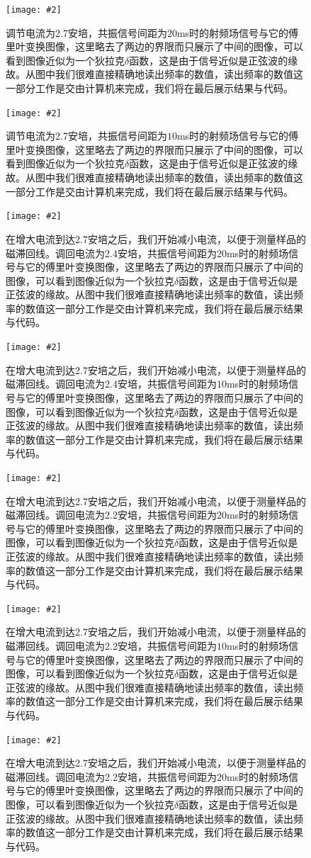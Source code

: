 \documentclass{ctexart}
\newcommand{\cpic}[2]{
\begin{center}
\texttt{[image: \#2]}
\end{center}
}
\newcommand{\cpicn}[3]
{
\begin{figure}[H]
\cpic{#1}{#2}
\caption{#3\label{#2}}
\end{figure}
}
\begin{document}
\cpicn{0.5}{27_1}{调节电流为2.7安培，共振信号间距为$20$ms时的射频场信号与它的傅里叶变换图像，这里略去了两边的界限而只展示了中间的图像，可以看到图像近似为一个狄拉克$\delta$函数，这是由于信号近似是正弦波的缘故。从图中我们很难直接精确地读出频率的数值，读出频率的数值这一部分工作是交由计算机来完成，我们将在最后展示结果与代码。}
\cpicn{0.5}{27_2}{调节电流为2.7安培，共振信号间距为$10$ms时的射频场信号与它的傅里叶变换图像，这里略去了两边的界限而只展示了中间的图像，可以看到图像近似为一个狄拉克$\delta$函数，这是由于信号近似是正弦波的缘故。从图中我们很难直接精确地读出频率的数值，读出频率的数值这一部分工作是交由计算机来完成，我们将在最后展示结果与代码。}
\cpicn{0.5}{24_1b}{在增大电流到达2.7安培之后，我们开始减小电流，以便于测量样品的磁滞回线。调回电流为2.4安培，共振信号间距为$20$ms时的射频场信号与它的傅里叶变换图像，这里略去了两边的界限而只展示了中间的图像，可以看到图像近似为一个狄拉克$\delta$函数，这是由于信号近似是正弦波的缘故。从图中我们很难直接精确地读出频率的数值，读出频率的数值这一部分工作是交由计算机来完成，我们将在最后展示结果与代码。}
\cpicn{0.5}{24_2b}{在增大电流到达2.7安培之后，我们开始减小电流，以便于测量样品的磁滞回线。调回电流为2.4安培，共振信号间距为$10$ms时的射频场信号与它的傅里叶变换图像，这里略去了两边的界限而只展示了中间的图像，可以看到图像近似为一个狄拉克$\delta$函数，这是由于信号近似是正弦波的缘故。从图中我们很难直接精确地读出频率的数值，读出频率的数值这一部分工作是交由计算机来完成，我们将在最后展示结果与代码。}
\cpicn{0.5}{22_1b}{在增大电流到达2.7安培之后，我们开始减小电流，以便于测量样品的磁滞回线。调回电流为2.2安培，共振信号间距为$20$ms时的射频场信号与它的傅里叶变换图像，这里略去了两边的界限而只展示了中间的图像，可以看到图像近似为一个狄拉克$\delta$函数，这是由于信号近似是正弦波的缘故。从图中我们很难直接精确地读出频率的数值，读出频率的数值这一部分工作是交由计算机来完成，我们将在最后展示结果与代码。}
\cpicn{0.5}{22_2b}{在增大电流到达2.7安培之后，我们开始减小电流，以便于测量样品的磁滞回线。调回电流为2.2安培，共振信号间距为$10$ms时的射频场信号与它的傅里叶变换图像，这里略去了两边的界限而只展示了中间的图像，可以看到图像近似为一个狄拉克$\delta$函数，这是由于信号近似是正弦波的缘故。从图中我们很难直接精确地读出频率的数值，读出频率的数值这一部分工作是交由计算机来完成，我们将在最后展示结果与代码。}
\cpicn{0.5}{20_1b}{在增大电流到达2.7安培之后，我们开始减小电流，以便于测量样品的磁滞回线。调回电流为2.2安培，共振信号间距为$20$ms时的射频场信号与它的傅里叶变换图像，这里略去了两边的界限而只展示了中间的图像，可以看到图像近似为一个狄拉克$\delta$函数，这是由于信号近似是正弦波的缘故。从图中我们很难直接精确地读出频率的数值，读出频率的数值这一部分工作是交由计算机来完成，我们将在最后展示结果与代码。}
\end{document}
